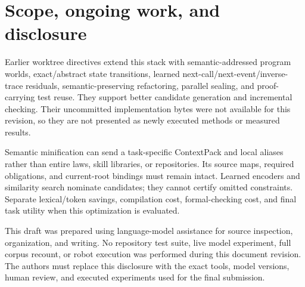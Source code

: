 \documentclass{article}
\begin{document}
\section{Scope, ongoing work, and disclosure}

Earlier worktree directives extend this stack with semantic-addressed program worlds, exact/abstract state transitions, learned next-call/next-event/inverse-trace residuals, semantic-preserving refactoring, parallel sealing, and proof-carrying test reuse. They support better candidate generation and incremental checking. Their uncommitted implementation bytes were not available for this revision, so they are not presented as newly executed methods or measured results.

Semantic minification can send a task-specific ContextPack and local aliases rather than entire laws, skill libraries, or repositories. Its source maps, required obligations, and current-root bindings must remain intact. Learned encoders and similarity search nominate candidates; they cannot certify omitted constraints. Separate lexical/token savings, compilation cost, formal-checking cost, and final task utility when this optimization is evaluated.

This draft was prepared using language-model assistance for source inspection, organization, and writing. No repository test suite, live model experiment, full corpus recount, or robot execution was performed during this document revision. The authors must replace this disclosure with the exact tools, model versions, human review, and executed experiments used for the final submission.
\end{document}
